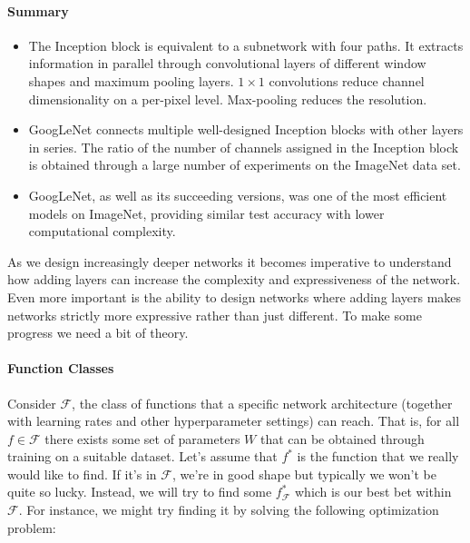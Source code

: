 \paragraph{Summary}

\begin{itemize}
    \item The Inception block is equivalent to a subnetwork with four paths. It extracts information in parallel through convolutional layers of different window shapes and maximum pooling layers. $1 \times 1$ convolutions reduce channel dimensionality on a per-pixel level. Max-pooling reduces the resolution.
    \item GoogLeNet connects multiple well-designed Inception blocks with other layers in series. The ratio of the number of channels assigned in the Inception block is obtained through a large number of experiments on the ImageNet data set.
    \item GoogLeNet, as well as its succeeding versions, was one of the most efficient models on ImageNet, providing similar test accuracy with lower computational complexity.
\end{itemize}

\label{cnn:resnet}

As we design increasingly deeper networks it becomes imperative to understand how adding layers can increase the complexity and expressiveness of the network. Even more important is the ability to design networks where adding layers makes networks strictly more expressive rather than just different. To make some progress we need a bit of theory.

\paragraph{Function Classes}

Consider $\mathcal{F}$, the class of functions that a specific network architecture (together with learning rates and other hyperparameter settings) can reach. That is, for all $f \in \mathcal{F}$ there exists some set of parameters $W$ that can be obtained through training on a suitable dataset. Let's assume that $f^*$ is the function that we really would like to find. If it's in $\mathcal{F}$, we're in good shape but typically we won't be quite so lucky. Instead, we will try to find some $f^*_\mathcal{F}$ which is our best bet within $\mathcal{F}$. For instance, we might try finding it by solving the following optimization problem:

